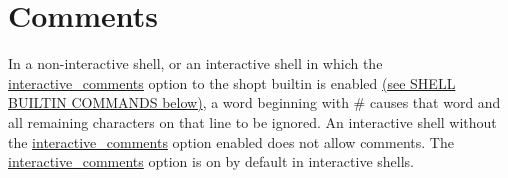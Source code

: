 \section{Comments}\label{sec:comments}
In a non-interactive shell, or an interactive shell in which the \url{interactive_comments} option to the shopt builtin is enabled \hyperref[sec:shellbuiltincommands]{(see SHELL BUILTIN COMMANDS below)}, a word beginning with \# causes that word and all remaining characters on that line to be ignored. An interactive shell without the \url{interactive_comments} option enabled does not allow comments. The \url{interactive_comments} option is on by default in interactive shells.